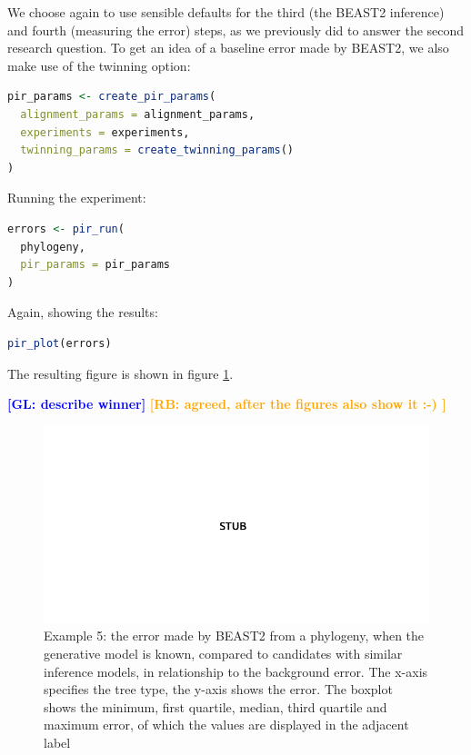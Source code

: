 \documentclass{article}
\newcommand{\giovanni}[1]{\textcolor{blue}{\textbf{[GL: #1]}}}
\newcommand{\richel}[1]{\textcolor{orange}{\textbf{[RB: #1]}}}
\begin{document}
We choose again to use sensible defaults for the third (the BEAST2 inference) and fourth (measuring the error) steps, as we previously did to answer the second research question. To get an idea of a baseline error made by BEAST2, we also make use of the twinning option:

\begin{lstlisting}[language=R, floatplacement=H, frame=single]
pir_params <- create_pir_params(
  alignment_params = alignment_params,
  experiments = experiments,
  twinning_params = create_twinning_params()
)
\end{lstlisting}

Running the experiment:

\begin{lstlisting}[language=R, floatplacement=H, frame=single]
errors <- pir_run(
  phylogeny,
  pir_params = pir_params
)
\end{lstlisting}

Again, showing the results:

\begin{lstlisting}[language=R, floatplacement=H, frame=single]
pir_plot(errors)
\end{lstlisting}

The resulting figure is shown in figure \ref{fig:example_5}.

\giovanni{describe winner}
\richel{agreed, after the figures also show it :-) }

\begin{figure}[h]
  \includegraphics[width=\textwidth]{example_5_errors.png}
  \caption{
    Example 5: the error made by BEAST2 from a phylogeny, when the generative model is known, compared to candidates with similar inference models, in relationship to the background error.
    The x-axis specifies the tree type, the y-axis shows the error.
    The boxplot shows the minimum, first quartile, median, third 
    quartile and maximum error, of which the values are displayed 
    in the adjacent label
  }
  \label{fig:example_5}
\end{figure}
\end{document}
